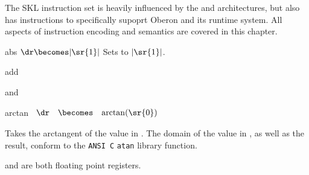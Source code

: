 
The SKL instruction set is heavily influenced by the \mips and
\natsemi architectures, but also has instructions to specifically
supoprt Oberon and its runtime system.  All aspects of instruction
encoding and semantics are covered in this chapter.


\begin{instruction}{abs}
     {\aaddopc}
     {$\dr \becomes |\sr{1}|$}
     {Sets \dr to $|\sr{1}|$.}
\end{instruction}


\begin{instruction}{add}
\end{instruction}


\begin{instruction}{and}
\end{instruction}


\begin{instruction}{arctan}
     {\arctanopc}
     {
       \begin{math}
         \begin{array}{lcl}
           \dr & \becomes & \arctan(\sr{0})
         \end{array}
       \end{math}
     }
     {Takes the arctangent of the value in .  The domain of the
     value in \texttt{}, as well as the result, conform to
     the \texttt{ANSI C} \texttt{atan} library function.

      and \dr are both floating point registers.}
\end{instruction}


